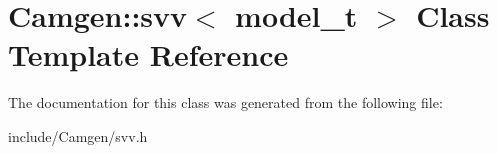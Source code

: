 \hypertarget{a00532}{}\section{Camgen\+:\+:svv$<$ model\+\_\+t $>$ Class Template Reference}
\label{a00532}


The documentation for this class was generated from the following file\+:\begin{DoxyCompactItemize}
\item 
include/\+Camgen/svv.\+h\end{DoxyCompactItemize}
